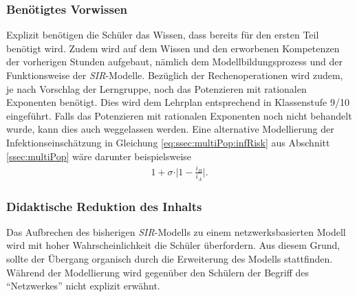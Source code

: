 \subsubsection*{Benötigtes Vorwissen}
Explizit benötigen die Schüler das Wissen, dass bereits für den ersten Teil benötigt wird. Zudem wird auf dem Wissen und den erworbenen Kompetenzen der vorherigen Stunden aufgebaut, nämlich dem Modellbildungsprozess und der Funktionsweise der \emph{SIR}-Modelle. Bezüglich der Rechenoperationen wird zudem, je nach Vorschlag der Lerngruppe, noch das Potenzieren mit rationalen Exponenten benötigt. Dies wird dem Lehrplan entsprechend in Klassenstufe 9/10 eingeführt. Falls das Potenzieren mit rationalen Exponenten noch nicht behandelt wurde, kann dies auch weggelassen werden. Eine alternative Modellierung der Infektionseinschätzung in Gleichung \ref{eq:ssec:multiPop:infRisk} aus Abschnitt \ref{ssec:multiPop} wäre darunter beispielsweise
\begin{align}
	1+\sigma\cdot \vert 1- \frac{i_B}{i_A}\vert.
\end{align}
\subsubsection*{Didaktische Reduktion des Inhalts}
Das Aufbrechen des bisherigen \emph{SIR}-Modells zu einem netzwerksbasierten Modell wird mit hoher Wahrscheinlichkeit die Schüler überfordern. Aus diesem Grund, sollte der Übergang organisch durch die Erweiterung des Modells stattfinden. Während der Modellierung wird gegenüber den Schülern der Begriff des ``Netzwerkes'' nicht explizit erwähnt.